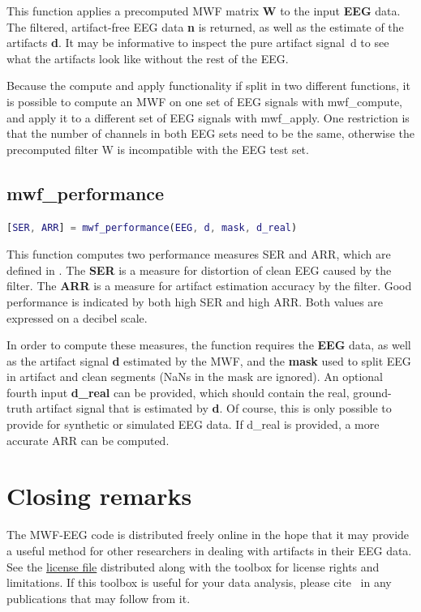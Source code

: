 \documentclass[11pt]{article}
\begin{document}
This function applies a precomputed MWF matrix \textbf{W} to the input \textbf{EEG} data. The filtered, artifact-free EEG data \textbf{n} is returned, as well as the estimate of the artifacts \textbf{d}. It may be informative to inspect the pure artifact signal~d to see what the artifacts look like without the rest of the EEG.

Because the compute and apply functionality if split in two different functions, it is possible to compute an MWF on one set of EEG signals with mwf\_compute, and apply it to a different set of EEG signals with mwf\_apply. One restriction is that the number of channels in both EEG sets need to be the same, otherwise the precomputed filter W is incompatible with the EEG test set.

\subsection{mwf\_performance}

\begin{lstlisting}[frame=single, language=matlab]
[SER, ARR] = mwf_performance(EEG, d, mask, d_real)
\end{lstlisting}

This function computes two performance measures SER and ARR, which are defined in \cite{somers2018generic}. The \textbf{SER} is a measure for distortion of clean EEG caused by the filter. The \textbf{ARR} is a measure for artifact estimation accuracy by the filter. Good performance is indicated by both high SER and high ARR. Both values are expressed on a decibel scale.

In order to compute these measures, the function requires the \textbf{EEG} data, as well as the artifact signal \textbf{d} estimated by the MWF, and the \textbf{mask} used to split EEG in artifact and clean segments (NaNs in the mask are ignored). An optional fourth input \textbf{d\_real} can be provided, which should contain the real, ground-truth artifact signal that is estimated by \textbf{d}. Of course, this is only possible to provide for synthetic or simulated EEG data. If d\_real is provided, a more accurate ARR can be computed.

\newpage
\section{Closing remarks}

The MWF-EEG code is distributed freely online in the hope that it may provide a useful method for other researchers in dealing with artifacts in their EEG data. See the \href{www.github.com/exporl/mwf-artifact-removal/blob/master/LICENSE.md}{license file} distributed along with the toolbox for license rights and limitations. If this toolbox is useful for your data analysis, please cite~ \cite{somers2018generic} in any publications that may follow from it.
\end{document}
